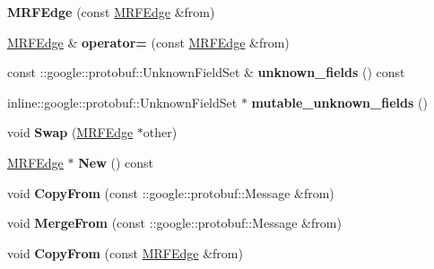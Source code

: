 \begin{DoxyCompactItemize}
\item 
\hypertarget{classgraph_1_1MRFEdge_aa09de56220ba0cb66c9fd9228ba4d221}{
{\bfseries MRFEdge} (const \hyperlink{classgraph_1_1MRFEdge}{MRFEdge} \&from)}
\label{classgraph_1_1MRFEdge_aa09de56220ba0cb66c9fd9228ba4d221}

\item 
\hypertarget{classgraph_1_1MRFEdge_a3b97945487b8335d0a845629dd61aa9a}{
\hyperlink{classgraph_1_1MRFEdge}{MRFEdge} \& {\bfseries operator=} (const \hyperlink{classgraph_1_1MRFEdge}{MRFEdge} \&from)}
\label{classgraph_1_1MRFEdge_a3b97945487b8335d0a845629dd61aa9a}

\item 
\hypertarget{classgraph_1_1MRFEdge_a291edbf56dd75cfc07882c224d78f6f2}{
const ::google::protobuf::UnknownFieldSet \& {\bfseries unknown\_\-fields} () const }
\label{classgraph_1_1MRFEdge_a291edbf56dd75cfc07882c224d78f6f2}

\item 
\hypertarget{classgraph_1_1MRFEdge_aaf28e2100240ef4b97bff1970da1bbae}{
inline::google::protobuf::UnknownFieldSet $\ast$ {\bfseries mutable\_\-unknown\_\-fields} ()}
\label{classgraph_1_1MRFEdge_aaf28e2100240ef4b97bff1970da1bbae}

\item 
\hypertarget{classgraph_1_1MRFEdge_afded0d8d16e77ef81e494cbdad220734}{
void {\bfseries Swap} (\hyperlink{classgraph_1_1MRFEdge}{MRFEdge} $\ast$other)}
\label{classgraph_1_1MRFEdge_afded0d8d16e77ef81e494cbdad220734}

\item 
\hypertarget{classgraph_1_1MRFEdge_a21211c0e2ad05324c09d90c86b5ba34e}{
\hyperlink{classgraph_1_1MRFEdge}{MRFEdge} $\ast$ {\bfseries New} () const }
\label{classgraph_1_1MRFEdge_a21211c0e2ad05324c09d90c86b5ba34e}

\item 
\hypertarget{classgraph_1_1MRFEdge_a65ec5aa99bae52421400d4b456955ce6}{
void {\bfseries CopyFrom} (const ::google::protobuf::Message \&from)}
\label{classgraph_1_1MRFEdge_a65ec5aa99bae52421400d4b456955ce6}

\item 
\hypertarget{classgraph_1_1MRFEdge_a83fe505e1c12d298d726853b09e566ad}{
void {\bfseries MergeFrom} (const ::google::protobuf::Message \&from)}
\label{classgraph_1_1MRFEdge_a83fe505e1c12d298d726853b09e566ad}

\item 
\hypertarget{classgraph_1_1MRFEdge_a432538f9cc47eaf753e771a1b6cb9a81}{
void {\bfseries CopyFrom} (const \hyperlink{classgraph_1_1MRFEdge}{MRFEdge} \&from)}
\label{classgraph_1_1MRFEdge_a432538f9cc47eaf753e771a1b6cb9a81}


\end{DoxyCompactItemize}
